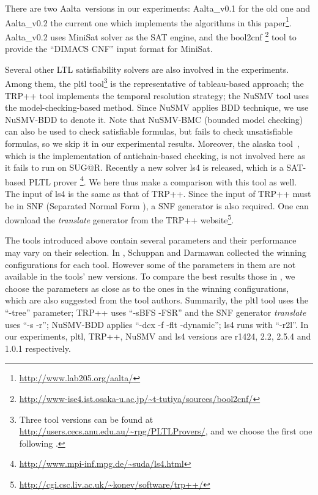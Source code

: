\documentclass[conference]{IEEEtran}
\def\Aalta{{Aalta}}
\begin{document}
There are two \Aalta\ versions in our experiments: \Aalta\_v0.1 for
the old one and \Aalta\_v0.2 the current one which implements the
algorithms in this paper\footnote{\url{http://www.lab205.org/aalta/}}.  \Aalta\_v0.2 uses MiniSat
\cite{ES03} solver as the SAT engine, and the bool2cnf
\footnote{\url{http://www-ise4.ist.osaka-u.ac.jp/~t-tutiya/sources/bool2cnf/}}
tool to provide the ``DIMACS CNF'' input format for MiniSat. 
\iffalse
Both these tools are invoked
externally. That means, \Aalta\_v0.2 provides the input for bool2cnf, the output of bool2cnf is the input of MiniSat, and then \Aalta\_v0.2 obtains Minisat's output for further processing. Although they can be integrated in the code level we deploy them directly for 
experimental usage, and the integration will be achieved when our new tool is released. These two 
tools are purely invoked and not parameters are used.  
\fi
Several
other LTL satisfiability solvers are also involved in the
experiments. Among them, the pltl tool\footnote{Three tool versions can be found at \url{http://users.cecs.anu.edu.au/~rpg/PLTLProvers/}, and we choose the first one following \cite{SD11}.} 
\cite{Sch98} is the
representative of tableau-based approach; the TRP++ tool \cite{HK03}
implements the temporal resolution strategy; the NuSMV tool
\cite{CCGGPRST02} uses the model-checking-based method. Since NuSMV
applies BDD technique, we use NuSMV-BDD to denote it. Note that
NuSMV-BMC (bounded model checking) can also be used to check satisfiable formulas, but fails to
check unsatisfiable formulas, so we skip it in our experimental
results. Moreover, the alaska tool~\cite{DDMR08}, which is the
implementation of antichain-based checking, is not involved here as it fails to run on SUG@R. 
Recently a new solver ls4 is released, which is a SAT-based PLTL prover\cite{SW12}
\footnote{\url{http://www.mpi-inf.mpg.de/~suda/ls4.html}}. We here thus 
make a comparison with this tool as well. The input of ls4 is the same as that of TRP++. 
Since the input of TRP++ must be in SNF (Separated Normal Form \cite{Fish97}), a SNF generator is also required. 
One can download the \textit{translate} generator from the TRP++ website\footnote{\url{http://cgi.csc.liv.ac.uk/~konev/software/trp++/}}. 

The tools introduced above contain several parameters and their performance may vary on their selection. 
In \cite{SD11}, Schuppan and Darmawan collected the winning configurations for each tool. 
However some of the parameters in them are not available in the tools' new versions. 
To compare the best results those in \cite{SD11}, we choose the parameters as close as to the ones in the winning configurations, which are also suggested from the tool authors. Summarily, the pltl tool uses the ``-tree'' parameter; TRP++ uses ``-sBFS -FSR'' and the SNF generator \textit{translate} uses ``-s -r''; NuSMV-BDD applies ``-dcx -f -flt -dynamic''; ls4 runs with ``-r2l''. In our experiments, pltl, TRP++, NuSMV and ls4 versions are r1424, 2.2, 2.5.4 and 1.0.1 respectively. 
\end{document}
